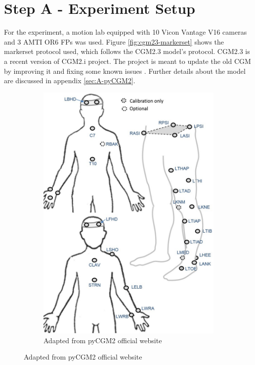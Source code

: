 \documentclass[../main.tex]{subfiles}
\begin{document}
\section{Step A - Experiment Setup}
For the experiment, a motion lab equipped with 10 Vicon Vantage V16 cameras and 3 AMTI OR6 \acp{FP} was used. 
Figure \ref{fig:cgm23-markerset} shows the markerset protocol used, which follows the CGM2.3 model's protocol. 
CGM2.3 is a recent version of CGM2.i project.
The project is meant to update the old \ac{CGM} by improving it and fixing some known issues \cite{Leboeuf2019}. 
Further details about the model are discussed in appendix \ref{sec:A-pyCGM2}.
\begin{figure}[!ht]
     \centering
     \begin{subfigure}[t]{0.58\textwidth}
         \centering
         \includegraphics[width=\textwidth]{img/CGM23_markerset.pdf}
         \caption{Adapted from pyCGM2 official website \cite{Leboeuf2019}}

\end{subfigure}
\end{figure}
\end{document}
